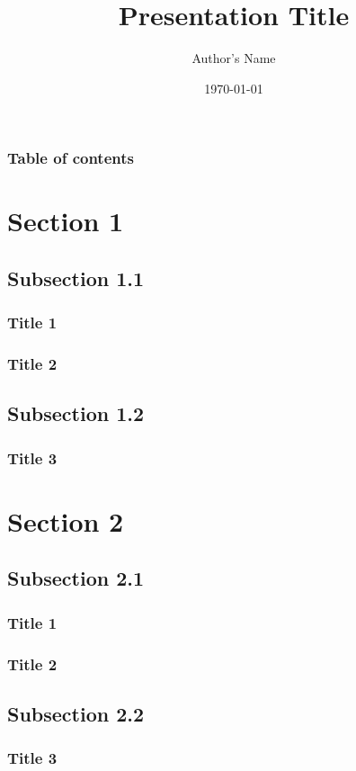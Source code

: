 \documentclass{beamer}
\begin{document}
\title{Presentation Title}  
\author{Author's Name}
\date{\today}

\begin{frame}[plain]
	\titlepage
\end{frame}

\begin{frame}[plain]
  \frametitle{Table of contents}
  \tableofcontents
\end{frame}


\section{Section 1} 
  \subsection{Subsection 1.1}
  \begin{frame}
    \frametitle{Title 1} 
    \lipsum[1-2]
  \end{frame}

  \begin{frame}
    \frametitle{Title 2} 
    \lipsum[2-3]
  \end{frame}

  \subsection{Subsection 1.2}
  \begin{frame}[plain]
    \frametitle{Title 3} 
    \lipsum[3-4]
  \end{frame}

\section{Section 2}
  \subsection{Subsection 2.1}
  \begin{frame}
    \frametitle{Title 1} 
    \lipsum[1-2]
  \end{frame}

  \begin{frame}
    \frametitle{Title 2} 
    \lipsum[2-3]
  \end{frame}

  \subsection{Subsection 2.2}
  \begin{frame}[plain]
    \frametitle{Title 3} 
    \lipsum[3-4]
  \end{frame}
\end{document}
